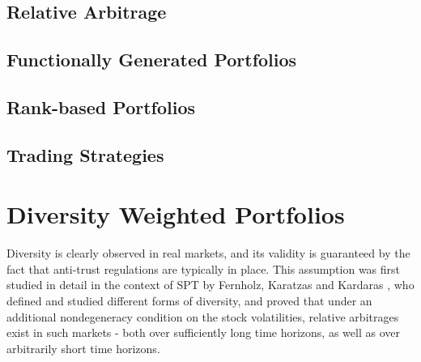 \documentclass[british]{amsart}
\numberwithin{equation}{section}
\numberwithin{figure}{section}
\theoremstyle{plain}
\theoremstyle{definition}
\theoremstyle{plain}
\theoremstyle{plain}
\theoremstyle{plain}
\begin{document}
\subsection{Relative Arbitrage}
\subsection{Functionally Generated Portfolios}
\subsection{Rank-based Portfolios}
\subsection{Trading Strategies}

\section{Diversity Weighted Portfolios}

Diversity is clearly observed in real markets, and its validity is guaranteed by 
the fact that anti-trust regulations are typically in place. This assumption was 
first studied in detail in the context of SPT by Fernholz, Karatzas and Kardaras 
\cite{fernholz2005}, who defined and studied different forms of diversity, and 
proved that under an additional nondegeneracy condition on the stock 
volatilities, relative arbitrages exist in such markets - both over sufficiently 
long time horizons, as well as over arbitrarily short time horizons.



\printbibliography
\end{document}
